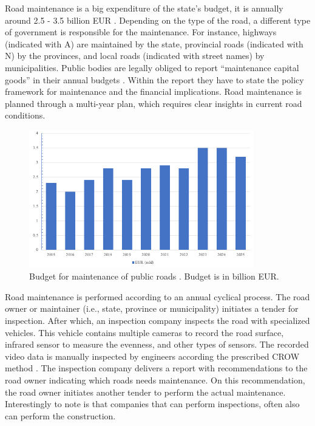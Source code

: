 Road maintenance is a big expenditure of the state's budget, it is annually around 2.5 - 3.5 billion EUR \cite{Rijksbegroting:Infrastructuur}. Depending on the type of the road, a different type of government is responsible for the maintenance. For instance, highways (indicated with A) are maintained by the state, provincial roads (indicated with N) by the provinces, and local roads (indicated with street names) by municipalities. Public bodies are legally obliged to report ``maintenance capital goods'' in their annual budgets \cite{Wet_Besluit_Begroting}. Within the report they have to state the policy framework for maintenance and the financial implications. Road maintenance is planned through a multi-year plan, which requires clear insights in current road conditions. 

\begin{figure}[ht]
    \begin{center}
    \includegraphics[height=6cm]{images/1_introduction/budget.png}
    \end{center}
    \caption{Budget for maintenance of public roads \cite{Rijksbegroting:Infrastructuur}. Budget is in billion EUR.}
    \label{fig:prm}
\end{figure}

Road maintenance is performed according to an annual cyclical process. The road owner or maintainer (i.e., state, province or municipality) initiates a tender for inspection. After which, an inspection company inspects the road with specialized vehicles. This vehicle contains multiple cameras to record the road surface, infrared sensor to measure the evenness, and other types of sensors. The recorded video data is manually inspected by engineers according the prescribed CROW method \cite{CROW_147}. The inspection company delivers a report with recommendations to the road owner indicating which roads needs maintenance. On this recommendation, the road owner initiates another tender to perform the actual maintenance. Interestingly to note is that companies that can perform inspections, often also can perform the construction.

